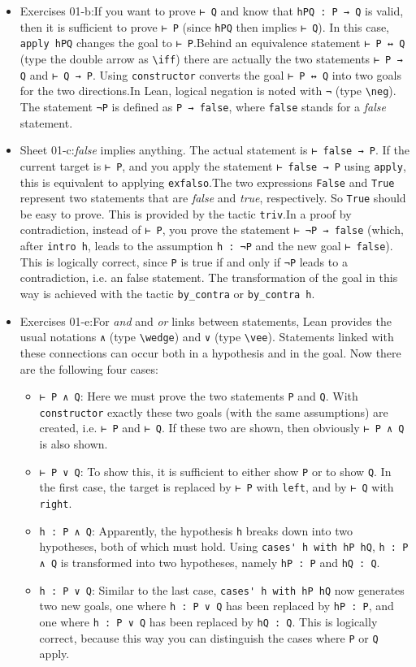 \documentclass{memoir}
\begin{document}
\begin{itemize}
\item Exercises 01-b:If you want to prove \Verb|⊢ Q| and know that \Verb|hPQ : P → Q| is valid, then it is sufficient to prove \Verb|⊢ P| (since \Verb|hPQ| then implies \Verb|⊢ Q|). In this case, \Verb|apply hPQ| changes the goal to \Verb|⊢ P|.Behind an equivalence statement \Verb|⊢ P ↔ Q| (type the double arrow as \Verb|\iff|) there are actually the two statements \Verb|⊢ P → Q| and \Verb|⊢ Q → P|. Using \Verb|constructor| converts the goal \Verb|⊢ P ↔ Q| into two goals for the two directions.In Lean, logical negation is noted with \Verb|¬| (type \Verb|\neg|). The statement \Verb|¬P| is defined as \Verb|P → false|, where \Verb|false| stands for a \emph{false} statement.\item Sheet 01-c:\emph{false} implies anything. The actual statement is \Verb|⊢ false → P|. If the current target is \Verb|⊢ P|, and you apply the statement \Verb|⊢ false → P| using \Verb|apply|, this is equivalent to applying \Verb|exfalso|.The two expressions \Verb|False| and \Verb|True| represent two statements that are \emph{false} and \emph{true}, respectively. So \Verb|True| should be easy to prove. This is provided by the tactic \Verb|triv|.In a proof by contradiction, instead of \Verb|⊢ P|, you prove the statement \Verb|⊢ ¬P → false| (which, after \Verb|intro h|, leads to the assumption \Verb|h : ¬P| and the new goal \Verb|⊢ false|). This is logically correct, since \Verb|P| is true if and only if \Verb|¬P| leads to a contradiction, i.e. an false statement. The transformation of the goal in this way is achieved with the tactic \Verb|by_contra| or \Verb|by_contra h|.\item Exercises 01-e:For \emph{and} and \emph{or} links between statements, Lean provides the usual notations \Verb|∧| (type \Verb|\wedge|) and \Verb|∨| (type \Verb|\vee|). Statements linked with these connections can occur both in a hypothesis and in the goal. Now there are the following four cases:\begin{itemize}
\item \Verb|⊢ P ∧ Q|: Here we must prove the two statements \Verb|P| and \Verb|Q|. With \Verb|constructor| exactly these two goals (with the same assumptions) are created, i.e. \Verb|⊢ P| and \Verb|⊢ Q|. If these two are shown, then obviously \Verb|⊢ P ∧ Q| is also shown.\item \Verb|⊢ P ∨ Q|: To show this, it is sufficient to either show \Verb|P| or to show \Verb|Q|. In the first case, the target is replaced by \Verb|⊢ P| with \Verb|left|, and by \Verb|⊢ Q| with \Verb|right|.\item \Verb|h : P ∧ Q|: Apparently, the hypothesis \Verb|h| breaks down into two hypotheses, both of which must hold. Using \Verb|cases' h with hP hQ|, \Verb|h : P ∧ Q| is transformed into two hypotheses, namely \Verb|hP : P| and \Verb|hQ : Q|.\item \Verb|h : P ∨ Q|: Similar to the last case, \Verb|cases' h with hP hQ| now generates two new goals, one where \Verb|h : P ∨ Q| has been replaced by \Verb|hP : P|, and one where \Verb|h : P ∨ Q| has been replaced by \Verb|hQ : Q|. This is logically correct, because this way you can distinguish the cases where \Verb|P| or \Verb|Q| apply.

\end{itemize}
\end{itemize}
\end{document}
